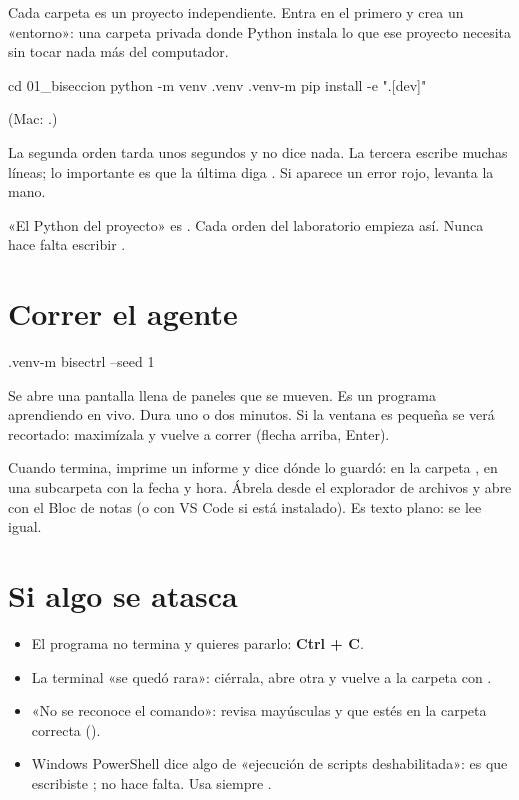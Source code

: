 Cada carpeta es un proyecto independiente. Entra en el primero y crea un «entorno»: una carpeta privada donde Python instala lo que ese proyecto necesita sin tocar nada más del computador.
\begin{orden}
cd 01_biseccion
python -m venv .venv
.venv\Scripts\python -m pip install -e ".[dev]"
\end{orden}
(Mac: .)

La segunda orden tarda unos segundos y no dice nada. La tercera escribe muchas líneas; lo importante es que la última diga . Si aparece un error rojo, levanta la mano.

\begin{nota}
«El Python del proyecto» es . Cada orden del laboratorio empieza así. Nunca hace falta escribir .
\end{nota}

\section{Correr el agente}
\begin{orden}
.venv\Scripts\python -m bisectrl --seed 1
\end{orden}
Se abre una pantalla llena de paneles que se mueven. Es un programa aprendiendo en vivo. Dura uno o dos minutos. Si la ventana es pequeña se verá recortado: maximízala y vuelve a correr (flecha arriba, Enter).

Cuando termina, imprime un informe y dice dónde lo guardó: en la carpeta , en una subcarpeta con la fecha y hora. Ábrela desde el explorador de archivos y abre  con el Bloc de notas (o con VS Code si está instalado). Es texto plano: se lee igual.

\section{Si algo se atasca}
\begin{itemize}
\item El programa no termina y quieres pararlo: \textbf{Ctrl + C}.
\item La terminal «se quedó rara»: ciérrala, abre otra y vuelve a la carpeta con .
\item «No se reconoce el comando»: revisa mayúsculas y que estés en la carpeta correcta ().
\item Windows PowerShell dice algo de «ejecución de scripts deshabilitada»: es que escribiste ; no hace falta. Usa siempre .
\end{itemize}

